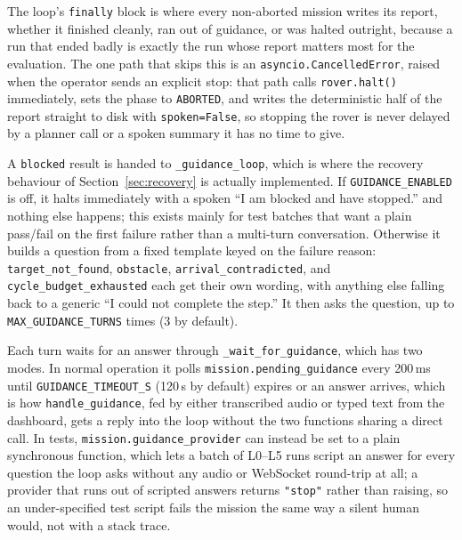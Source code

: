 The loop's \texttt{finally} block is where every non-aborted mission writes
its report, whether it finished cleanly, ran out of guidance, or was halted
outright, because a run that ended badly is exactly the run whose report
matters most for the evaluation. The one path that skips this is an
\texttt{asyncio.CancelledError}, raised when the operator sends an explicit
stop: that path calls \texttt{rover.halt()} immediately, sets the phase to
\texttt{ABORTED}, and writes the deterministic half of the report straight to
disk with \texttt{spoken=False}, so stopping the rover is never delayed by a
planner call or a spoken summary it has no time to give.

\label{ssec:guidance_loop}

A \texttt{blocked} result is handed to \texttt{\_guidance\_loop}, which is
where the recovery behaviour of Section~\ref{sec:recovery} is actually
implemented. If \texttt{GUIDANCE\_ENABLED} is off, it halts immediately with
a spoken ``I am blocked and have stopped.'' and nothing else happens; this
exists mainly for test batches that want a plain pass/fail on the first
failure rather than a multi-turn conversation. Otherwise it builds a question
from a fixed template keyed on the failure reason:
\texttt{target\_not\_found}, \texttt{obstacle}, \texttt{arrival\_contradicted},
and \texttt{cycle\_budget\_exhausted} each get their own wording, with
anything else falling back to a generic ``I could not complete the step.''
It then asks the question, up to \texttt{MAX\_GUIDANCE\_TURNS} times (3 by default).

Each turn waits for an answer through \texttt{\_wait\_for\_guidance}, which has
two modes. In normal operation it polls \texttt{mission.pending\_guidance}
every 200\,ms until \texttt{GUIDANCE\_TIMEOUT\_S} (120\,s by default) expires
or an answer arrives, which is how \texttt{handle\_guidance}, fed by either
transcribed audio or typed text from the dashboard, gets a reply into the
loop without the two functions sharing a direct call. In tests,
\texttt{mission.guidance\_provider} can instead be set to a plain synchronous
function, which lets a batch of L0–L5 runs script an answer for every
question the loop asks without any audio or WebSocket round-trip at all; a
provider that runs out of scripted answers returns \texttt{"stop"} rather than
raising, so an under-specified test script fails the mission the same way a
silent human would, not with a stack trace.

